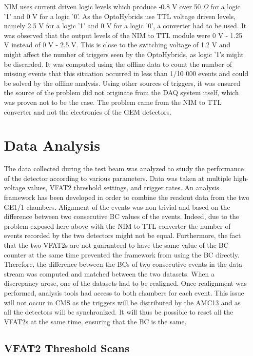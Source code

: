       NIM uses current driven logic levels which produce -0.8 V over 50 $\Omega$ for a logic '1' and 0 V for a logic '0'. As the OptoHybrids use TTL voltage driven levels, namely 2.5 V for a logic '1' and 0 V for a logic '0', a converter had to be used. It was observed that the output levels of the NIM to TTL module were 0 V - 1.25 V instead of 0 V - 2.5 V. This is close to the switching voltage of 1.2 V and might affect the number of triggers seen by the OptoHybrids, as logic '1's might be discarded. It was computed using the offline data to count the number of missing events that this situation occurred in less than 1/10 000 events and could be solved by the offline analysis. Using other sources of triggers, it was ensured the source of the problem did not originate from the DAQ system itself, which was proven not to be the case. The problem came from the NIM to TTL converter and not the electronics of the GEM detectors.

  \section{Data Analysis}

    The data collected during the test beam was analyzed to study the performance of the detector according to various parameters. Data was taken at multiple high-voltage values, VFAT2 threshold settings, and trigger rates. An analysis framework has been developed in order to combine the readout data from the two GE1/1 chambers. Alignment of the events was non-trivial and based on the difference between two consecutive BC values of the events. Indeed, due to the problem exposed here above with the NIM to TTL converter the number of events recorded by the two detectors might not be equal. Furthermore, the fact that the two VFAT2s are not guaranteed to have the same value of the BC counter at the same time prevented the framework from using the BC directly. Therefore, the difference between the BCs of two consecutive events in the data stream was computed and matched between the two datasets. When a discrepancy arose, one of the datasets had to be realigned. Once realignment was performed, analysis tools had access to both chambers for each event. This issue will not occur in CMS as the triggers will be distributed by the AMC13 and as all the detectors will be synchronized. It will thus be possible to reset all the VFAT2s at the same time, ensuring that the BC is the same.

    \subsection{VFAT2 Threshold Scans}

